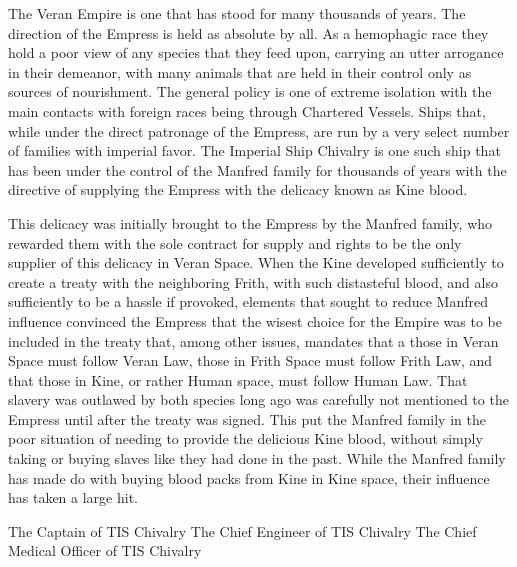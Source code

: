 \documentclass[blue]{guildcamp4}
\begin{document}
\name{\bVer{}}

The Veran Empire is one that has stood for many thousands of years. The direction of the Empress is held as absolute by all. As a hemophagic race they hold a poor view of any species that they feed upon, carrying an utter arrogance in their demeanor, with many animals that are held in their control only as sources of nourishment. The general policy is one of extreme isolation with the main contacts with foreign races being through Chartered Vessels. Ships that, while under the direct patronage of the Empress, are run by a very select number of families with imperial favor. The Imperial Ship Chivalry is one such ship that has been under the control of the Manfred family for thousands of years with the directive of supplying the Empress with the delicacy known as Kine blood. 

This delicacy was initially brought to the Empress by the Manfred family, who rewarded them with the sole contract for supply and rights to be the only supplier of this delicacy in Veran Space. When the Kine developed sufficiently to create a treaty with the neighboring Frith, with such distasteful blood, and also sufficiently to be a hassle if provoked, elements that sought to reduce Manfred influence convinced the Empress that the wisest choice for the Empire was to be included in the treaty that, among other issues, mandates that a those in Veran Space must follow Veran Law, those in Frith Space must follow Frith Law, and that those in Kine, or rather Human space, must follow Human Law. That slavery was outlawed by both species long ago was carefully not mentioned to the Empress until after the treaty was signed. This put the Manfred family in the poor situation of needing to provide the delicious Kine blood, without simply taking or buying slaves like they had done in the past. While the Manfred family has made do with buying blood packs from Kine in Kine space, their influence has taken a large hit.






\begin{members}
	\member{\cVone{}} The Captain of TIS Chivalry
	\member{\cVtwo{}} The Chief Engineer of TIS Chivalry
	\member{\cVthree{}} The Chief Medical Officer of TIS Chivalry

\end{members}
\end{document}
